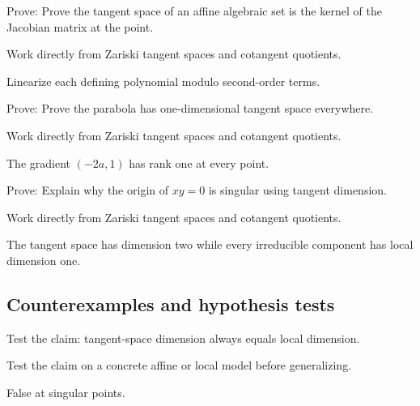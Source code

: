 \begin{exercise}\label{exr:vi32-expand-07}
Prove: Prove the tangent space of an affine algebraic set is the kernel of the Jacobian matrix at the point.
\end{exercise}
\begin{hint}
Work directly from Zariski tangent spaces and cotangent quotients.
\end{hint}
\begin{solution}
Linearize each defining polynomial modulo second-order terms.
\end{solution}

\begin{exercise}\label{exr:vi32-expand-08}
Prove: Prove the parabola has one-dimensional tangent space everywhere.
\end{exercise}
\begin{hint}
Work directly from Zariski tangent spaces and cotangent quotients.
\end{hint}
\begin{solution}
The gradient $(-2a,1)$ has rank one at every point.
\end{solution}

\begin{exercise}\label{exr:vi32-expand-09}
Prove: Explain why the origin of $xy=0$ is singular using tangent dimension.
\end{exercise}
\begin{hint}
Work directly from Zariski tangent spaces and cotangent quotients.
\end{hint}
\begin{solution}
The tangent space has dimension two while every irreducible component has local dimension one.
\end{solution}

\subsection*{Counterexamples and hypothesis tests}

\begin{exercise}\label{exr:vi32-expand-10}
Test the claim: tangent-space dimension always equals local dimension.
\end{exercise}
\begin{hint}
Test the claim on a concrete affine or local model before generalizing.
\end{hint}
\begin{solution}
False at singular points.
\end{solution}

